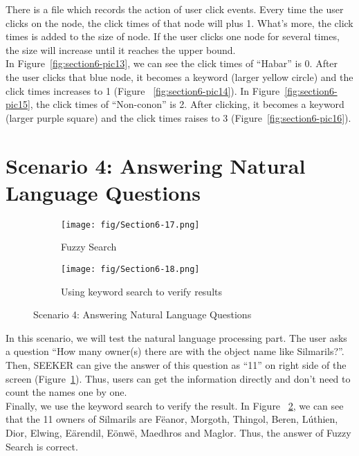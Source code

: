 \indent There is a file which records the action of user click events. Every time the user clicks on the node, the click times of that node will plus 1. What's more, the click times is added to the size of node. If the user clicks one node for several times, the size will increase until it reaches the upper bound.\\
\indent In Figure~\ref{fig:section6-pic13}, we can see the click times of ``Habar'' is 0. After the user clicks that blue node, it becomes a keyword (larger yellow circle) and the click times increases to 1 (Figure~ \ref{fig:section6-pic14}). In Figure~\ref{fig:section6-pic15}, the click times of ``Non-conon'' is 2. After clicking, it becomes a keyword (larger purple square) and the click times raises to 3 (Figure~\ref{fig:section6-pic16}).

\section{Scenario 4: Answering Natural Language Questions}
\begin{figure*}[!htb]
	\centering
	\begin{subfigure}{0.47\textwidth}
		\texttt{[image: fig/Section6-17.png]}
		\caption{Fuzzy Search} 
		\label{fig:section6-pic17}
	\end{subfigure}
	\hspace*{\fill} %
	\begin{subfigure}{0.47\textwidth}
		\texttt{[image: fig/Section6-18.png]}
		\caption{Using keyword search to verify results} \label{fig:section6-pic18}
	\end{subfigure}
	\vspace{-10pt}
	\caption{Scenario 4: Answering Natural Language Questions} \label{fig:section6-pic1718}
	\vspace{-20pt}
\end{figure*}
\vspace{-30pt}
In this scenario, we will test the natural language processing part. The user asks a question ``How many owner(s) there are with the object name like Silmarils?''. Then, SEEKER can give the answer of this question as ``11'' on right side of the screen (Figure~\ref{fig:section6-pic17}). Thus, users can get the information directly and don't need to count the names one by one.\\
\indent Finally, we use the keyword search to verify the result. In Figure~ \ref{fig:section6-pic18}, we can see that the 11 owners of Silmarils are Fëanor, Morgoth, Thingol, Beren, Lúthien, Dior, Elwing, Eärendil, Eönwë, Maedhros and Maglor. Thus, the answer of Fuzzy Search is correct.
